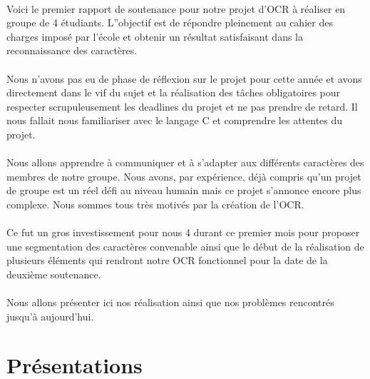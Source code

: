 \documentclass{article}
\begin{document}
	\paragraph{}
    Voici le premier rapport de soutenance pour notre projet d'OCR à réaliser en groupe de 4 étudiants. L''objectif est de répondre pleinement au cahier des charges imposé par l'école et obtenir un résultat satisfaisant dans la reconnaissance des caractères.
	
	\paragraph{}
    Nous n'avons pas eu de phase de réflexion sur le projet pour cette année et avons directement dans le vif du sujet et la réalisation des tâches obligatoires pour respecter scrupuleusement les deadlines du projet et ne pas prendre de retard. Il nous fallait nous familiariser avec le langage C et comprendre les attentes du projet.
	
	\paragraph{}
    Nous allons apprendre à communiquer et à s'adapter aux différents caractères des membres de notre groupe. Nous avons, par expérience, déjà compris qu'un projet de groupe est un réel défi au niveau humain mais ce projet s'annonce encore plus complexe.
    Nous sommes tous très motivés par la création de l'OCR.
	
	\paragraph{}
    Ce fut un gros investissement pour nous 4 durant ce premier mois pour proposer une segmentation des caractères convenable ainsi que le début de la réalisation de plusieurs éléments qui rendront notre OCR fonctionnel pour la date de la deuxième soutenance.

	\paragraph{}
    Nous allons présenter ici nos réalisation ainsi que nos problèmes rencontrés jusqu'à aujourd'hui.

\newpage
{}
\vspace*{2cm}
\section{Présentations}
\end{document}
